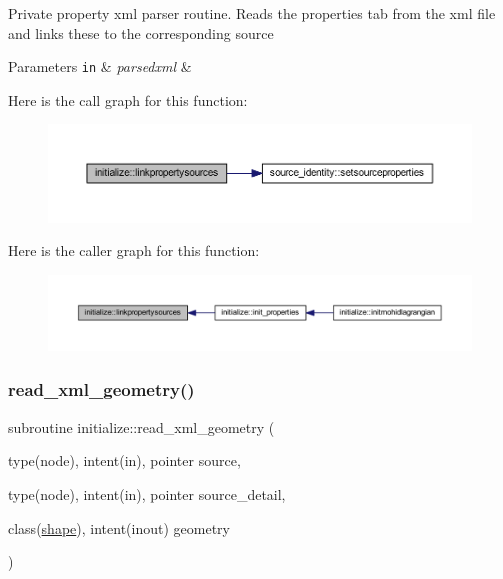 Private property xml parser routine. Reads the properties tab from the xml file and links these to the corresponding source 
\begin{DoxyParams}[1]{Parameters}
\mbox{\tt in}  & {\em parsedxml} & \\
\hline
\end{DoxyParams}
Here is the call graph for this function\+:
\nopagebreak
\begin{figure}[H]
\begin{center}
\leavevmode
\includegraphics[width=350pt]{namespaceinitialize_ab91b27efd537a161ee9ca4b2d9efde1a_cgraph}
\end{center}
\end{figure}
Here is the caller graph for this function\+:
\nopagebreak
\begin{figure}[H]
\begin{center}
\leavevmode
\includegraphics[width=350pt]{namespaceinitialize_ab91b27efd537a161ee9ca4b2d9efde1a_icgraph}
\end{center}
\end{figure}
\mbox{\label{namespaceinitialize_ad36e4f602dab66c06a1f0e2474e9f0a6}} 
\subsubsection{\texorpdfstring{read\+\_\+xml\+\_\+geometry()}{read\_xml\_geometry()}}
{\footnotesize\ttfamily subroutine initialize\+::read\+\_\+xml\+\_\+geometry (\begin{DoxyParamCaption}\item[{type(node), intent(in), pointer}]{source,  }\item[{type(node), intent(in), pointer}]{source\+\_\+detail,  }\item[{class(\mbox{\hyperlink{structgeometry_1_1shape}{shape}}), intent(inout)}]{geometry }\end{DoxyParamCaption})\hspace{0.3cm}{\ttfamily [private]}}



